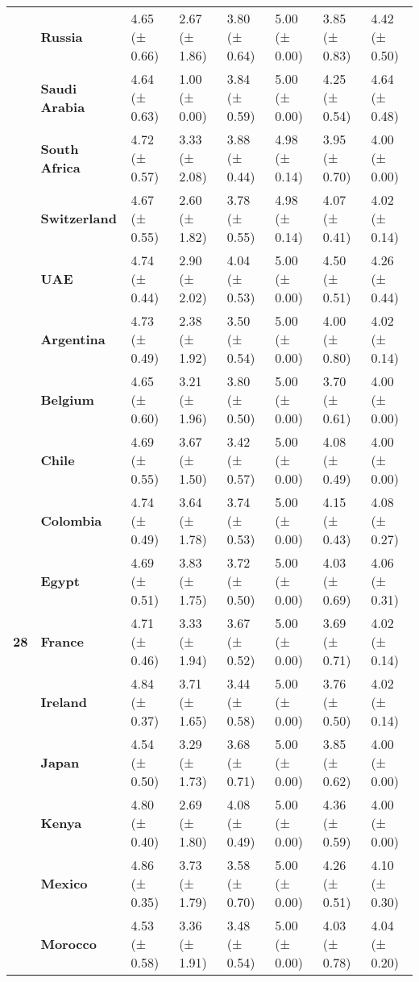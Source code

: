 \begin{longtable}{llllllll}
\textbf{} & \textbf{Russia} & 4.65 (± 0.66) & 2.67 (± 1.86) & 3.80 (± 0.64) & 5.00 (± 0.00) & 3.85 (± 0.83) & 4.42 (± 0.50) \\
\textbf{} & \textbf{Saudi Arabia} & 4.64 (± 0.63) & 1.00 (± 0.00) & 3.84 (± 0.59) & 5.00 (± 0.00) & 4.25 (± 0.54) & 4.64 (± 0.48) \\
\textbf{} & \textbf{South Africa} & 4.72 (± 0.57) & 3.33 (± 2.08) & 3.88 (± 0.44) & 4.98 (± 0.14) & 3.95 (± 0.70) & 4.00 (± 0.00) \\
\textbf{} & \textbf{Switzerland} & 4.67 (± 0.55) & 2.60 (± 1.82) & 3.78 (± 0.55) & 4.98 (± 0.14) & 4.07 (± 0.41) & 4.02 (± 0.14) \\
\textbf{} & \textbf{UAE} & 4.74 (± 0.44) & 2.90 (± 2.02) & 4.04 (± 0.53) & 5.00 (± 0.00) & 4.50 (± 0.51) & 4.26 (± 0.44) \\
\cline{1-8}
\multirow[t]{19}{*}{\textbf{28}} & \textbf{Argentina} & 4.73 (± 0.49) & 2.38 (± 1.92) & 3.50 (± 0.54) & 5.00 (± 0.00) & 4.00 (± 0.80) & 4.02 (± 0.14) \\
\textbf{} & \textbf{Belgium} & 4.65 (± 0.60) & 3.21 (± 1.96) & 3.80 (± 0.50) & 5.00 (± 0.00) & 3.70 (± 0.61) & 4.00 (± 0.00) \\
\textbf{} & \textbf{Chile} & 4.69 (± 0.55) & 3.67 (± 1.50) & 3.42 (± 0.57) & 5.00 (± 0.00) & 4.08 (± 0.49) & 4.00 (± 0.00) \\
\textbf{} & \textbf{Colombia} & 4.74 (± 0.49) & 3.64 (± 1.78) & 3.74 (± 0.53) & 5.00 (± 0.00) & 4.15 (± 0.43) & 4.08 (± 0.27) \\
\textbf{} & \textbf{Egypt} & 4.69 (± 0.51) & 3.83 (± 1.75) & 3.72 (± 0.50) & 5.00 (± 0.00) & 4.03 (± 0.69) & 4.06 (± 0.31) \\
\textbf{} & \textbf{France} & 4.71 (± 0.46) & 3.33 (± 1.94) & 3.67 (± 0.52) & 5.00 (± 0.00) & 3.69 (± 0.71) & 4.02 (± 0.14) \\
\textbf{} & \textbf{Ireland} & 4.84 (± 0.37) & 3.71 (± 1.65) & 3.44 (± 0.58) & 5.00 (± 0.00) & 3.76 (± 0.50) & 4.02 (± 0.14) \\
\textbf{} & \textbf{Japan} & 4.54 (± 0.50) & 3.29 (± 1.73) & 3.68 (± 0.71) & 5.00 (± 0.00) & 3.85 (± 0.62) & 4.00 (± 0.00) \\
\textbf{} & \textbf{Kenya} & 4.80 (± 0.40) & 2.69 (± 1.80) & 4.08 (± 0.49) & 5.00 (± 0.00) & 4.36 (± 0.59) & 4.00 (± 0.00) \\
\textbf{} & \textbf{Mexico} & 4.86 (± 0.35) & 3.73 (± 1.79) & 3.58 (± 0.70) & 5.00 (± 0.00) & 4.26 (± 0.51) & 4.10 (± 0.30) \\
\textbf{} & \textbf{Morocco} & 4.53 (± 0.58) & 3.36 (± 1.91) & 3.48 (± 0.54) & 5.00 (± 0.00) & 4.03 (± 0.78) & 4.04 (± 0.20) \\

\end{longtable}
